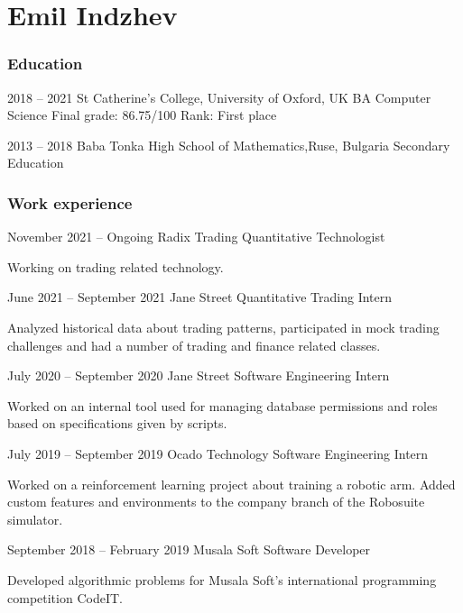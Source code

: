 \documentclass{tccv}
\begin{document}
\part{Emil Indzhev}

\section{Education}

\begin{yearlist}

\item{2018 -- 2021}
     {St Catherine's College, \newline
     University of Oxford, UK}
     {BA Computer Science \newline
     Final grade: 86.75/100 \newline
     Rank: First place}

\item{2013 -- 2018}
     {Baba Tonka High School of Mathematics,\newline Ruse, Bulgaria}
     {Secondary Education}

\end{yearlist}

\section{Work experience}

\begin{eventlist}

\item{November 2021 -- Ongoing}
     {Radix Trading}
     {Quantitative Technologist}

Working on trading related technology.

\item{June 2021 -- September 2021}
     {Jane Street}
     {Quantitative Trading Intern}

Analyzed historical data about trading patterns,
participated in mock trading challenges and had a number of
trading and finance related classes. 

\item{July 2020 -- September 2020}
     {Jane Street}
     {Software Engineering Intern}

Worked on an internal tool used for managing database permissions and roles
based on specifications given by scripts.

\item{July 2019 -- September 2019}
     {Ocado Technology}
     {Software Engineering Intern}

Worked on a reinforcement learning project about training a robotic arm. Added custom features and environments to the company branch of the Robosuite simulator.

\item{September 2018 -- February 2019}
     {Musala Soft}
     {Software Developer}

Developed algorithmic problems for Musala Soft's international programming competition CodeIT.

\end{eventlist}
\end{document}

